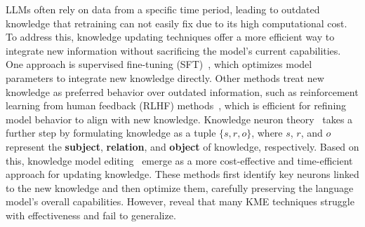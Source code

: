 LLMs often rely on data from a specific time period, leading to outdated knowledge that retraining can not easily fix due to its high computational cost. To address this, knowledge updating techniques offer a more efficient way to integrate new information without sacrificing the model's current capabilities.
One approach is supervised fine-tuning (SFT)~\cite{liu2024codeupdatearena, peng2023instruction}, which optimizes model parameters to integrate new knowledge directly. 
Other methods treat new knowledge as preferred behavior over outdated information, such as  reinforcement learning from human feedback (RLHF) methods~\cite{schulman2017ppo, meng2024simpo, rafailov2023dpo, hong2024orpo}, which is efficient for refining model behavior to align with new knowledge. 
Knowledge neuron theory~\cite{dai2022knowledgeneuron} takes a further step by formulating knowledge as a tuple $\{s, r, o\}$, where $s$, $r$, and $o$ represent the \textbf{subject}, \textbf{relation}, and \textbf{object} of knowledge, respectively.
Based on this, knowledge model editing~\cite{meng2022rome, hartvigsen2023grace, meng2023memit} emerge as a more cost-effective and time-efficient approach for updating knowledge. These methods first identify key neurons linked to the new knowledge and then optimize them, carefully preserving the language model’s overall capabilities. However, \citet{li2024modeleditingllms4codefar} reveal that many KME techniques struggle with effectiveness and fail to generalize.

